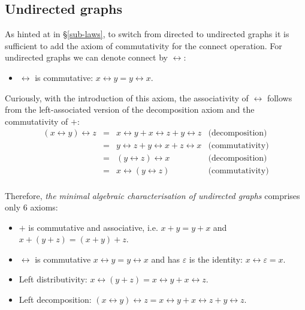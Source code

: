 \subsection{Undirected graphs}\label{sub-undirected}

As hinted at in \S\ref{sub-laws}, to switch from directed to undirected graphs it
is sufficient to add the axiom of commutativity for the connect operation. For
undirected graphs we can denote connect by $\leftrightarrow$:

\begin{itemize}
    \item $\leftrightarrow$ is commutative: $x \leftrightarrow y = y \leftrightarrow x$.
\end{itemize}

Curiously, with the introduction of this axiom, the associativity of $\leftrightarrow$
follows from the left-associated version of the decomposition axiom and the
commutativity of $+$:
\[
\begin{array}{rcll}
(x \leftrightarrow y) \leftrightarrow z & = & x \leftrightarrow y + x \leftrightarrow z + y \leftrightarrow z & \text{(decomposition)}\\
 & = & y \leftrightarrow z + y \leftrightarrow x + z \leftrightarrow x & \text{(commutativity)}\\
 & = &  (y \leftrightarrow z) \leftrightarrow x & \text{(decomposition)}\\
 & = &   x \leftrightarrow (y \leftrightarrow z) & \text{(commutativity)}\\
\end{array}
\]

Therefore, \emph{the minimal algebraic characterisation of undirected graphs}
comprises only 6 axioms:

\begin{itemize}
    \item $+$ is commutative and associative, i.e. $x + y = y + x$ and
    $x + (y + z) = (x + y) + z$.
    \item $\leftrightarrow$ is commutative $x \leftrightarrow y = y \leftrightarrow x$ and
    has $\varepsilon$ is the identity: $x \leftrightarrow \varepsilon = x$.
    \item Left distributivity:
    $x \leftrightarrow (y + z) = x \leftrightarrow y + x \leftrightarrow z$.
    \item Left decomposition: $(x \leftrightarrow y) \leftrightarrow z =
    x \leftrightarrow y + x \leftrightarrow z + y \leftrightarrow z$.
\end{itemize}

